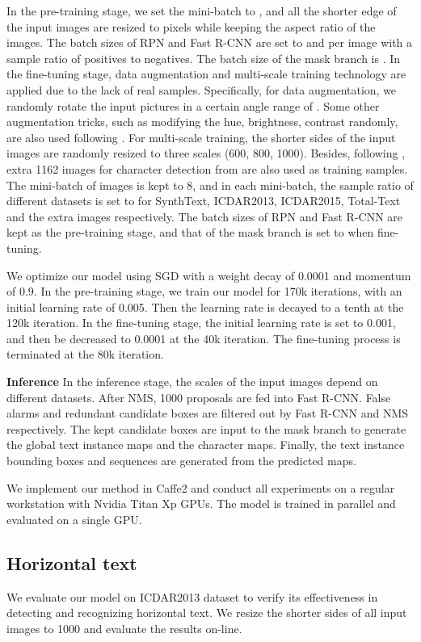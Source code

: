 \documentclass[runningheads]{llncs}
\begin{document}
In the pre-training stage, we set the mini-batch to , and all the shorter edge of the input images are resized to  pixels while keeping the aspect ratio of the images. The batch sizes of RPN and Fast R-CNN are set to  and  per image with a  sample ratio of positives to negatives. The batch size of the mask branch is . In the fine-tuning stage, data augmentation and multi-scale training technology are applied due to the lack of real samples. Specifically, for data augmentation, we randomly rotate the input pictures in a certain angle range of . Some other augmentation tricks, such as modifying the hue, brightness, contrast randomly, are also used following \cite{liu2016ssd}. For multi-scale training, the shorter sides of the input images are randomly resized to three scales (600, 800, 1000). Besides, following \cite{Li_2017_ICCV}, extra 1162 images for character detection from \cite{zhong2016deeptext} are also used as training samples. The mini-batch of images is kept to 8, and in each mini-batch, the sample ratio of different datasets is set to  for SynthText, ICDAR2013, ICDAR2015, Total-Text and the extra images respectively. The batch sizes of RPN and Fast R-CNN are kept as the pre-training stage, and that of the mask branch is set to  when fine-tuning.

We optimize our model using SGD with a weight decay of 0.0001 and momentum of 0.9. In the pre-training stage, we train our model for 170k iterations, with an initial learning rate of 0.005. Then the learning rate is decayed to a tenth at the 120k iteration. In the fine-tuning stage, the initial learning rate is set to 0.001, and then be decreased to 0.0001 at the 40k iteration. The fine-tuning process is terminated at the 80k iteration.

\textbf{Inference} In the inference stage, the scales of the input images depend on different datasets. After NMS, 1000 proposals are fed into Fast R-CNN. False alarms and redundant candidate boxes are filtered out by Fast R-CNN and NMS respectively. The kept candidate boxes are input to the mask branch to generate the global text instance maps and the character maps. Finally, the text instance bounding boxes and sequences are generated from the predicted maps.

We implement our method in Caffe2 and conduct all experiments on a regular workstation with Nvidia Titan Xp GPUs. The model is trained in parallel and evaluated on a single GPU.

\subsection{Horizontal text}
We evaluate our model on ICDAR2013 dataset to verify its effectiveness in detecting and recognizing horizontal text. We resize the shorter sides of all input images to 1000 and evaluate the results on-line.
\end{document}
